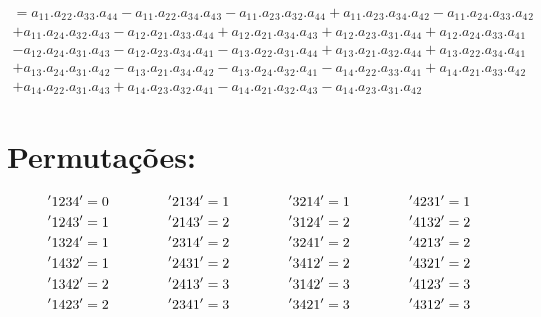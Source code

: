 \documentclass{article}
\begin{document}
\begin{equation*}
    \begin{split}
    = a_1{}_1.a_2{}_2.a_3{}_3.a_4{}_4 - a_1{}_1.a_2{}_2.a_3{}_4.a_4{}_3 - a_1{}_1.a_2{}_3.a_3{}_2.a_4{}_4 + a_1{}_1.a_2{}_3.a_3{}_4.a_4{}_2 - a_1{}_1.a_2{}_4.a_3{}_3.a_4{}_2\\
    + a_1{}_1.a_2{}_4.a_3{}_2.a_4{}_3 - a_1{}_2.a_2{}_1.a_3{}_3.a_4{}_4 + a_1{}_2.a_2{}_1.a_3{}_4.a_4{}_3 + a_1{}_2.a_2{}_3.a_3{}_1.a_4{}_4 + a_1{}_2.a_2{}_4.a_3{}_3.a_4{}_1\\
    - a_1{}_2.a_2{}_4.a_3{}_1.a_4{}_3 - a_1{}_2.a_2{}_3.a_3{}_4.a_4{}_1 - a_1{}_3.a_2{}_2.a_3{}_1.a_4{}_4 + a_1{}_3.a_2{}_1.a_3{}_2.a_4{}_4 + a_1{}_3.a_2{}_2.a_3{}_4.a_4{}_1\\
    + a_1{}_3.a_2{}_4.a_3{}_1.a_4{}_2 - a_1{}_3.a_2{}_1.a_3{}_4.a_4{}_2 - a_1{}_3.a_2{}_4.a_3{}_2.a_4{}_1 - a_1{}_4.a_2{}_2.a_3{}_3.a_4{}_1 + a_1{}_4.a_2{}_1.a_3{}_3.a_4{}_2\\
    + a_1{}_4.a_2{}_2.a_3{}_1.a_4{}_3 + a_1{}_4.a_2{}_3.a_3{}_2.a_4{}_1 - a_1{}_4.a_2{}_1.a_3{}_2.a_4{}_3 - a_1{}_4.a_2{}_3.a_3{}_1.a_4{}_2 
    \end{split}
\end{equation*}

\section{Permutações:}

\[ '1234' = 0 \hspace{1.5cm} '2134' = 1 \hspace{1.5cm} '3214' = 1 \hspace{1.5cm} '4231' = 1\] 
\[ '1243' = 1 \hspace{1.5cm} '2143' = 2 \hspace{1.5cm} '3124' = 2 \hspace{1.5cm} '4132' = 2\] 
\[ '1324' = 1 \hspace{1.5cm} '2314' = 2 \hspace{1.5cm} '3241' = 2 \hspace{1.5cm} '4213' = 2\] 
\[ '1432' = 1 \hspace{1.5cm} '2431' = 2 \hspace{1.5cm} '3412' = 2 \hspace{1.5cm} '4321' = 2\]
\[ '1342' = 2 \hspace{1.5cm} '2413' = 3 \hspace{1.5cm} '3142' = 3 \hspace{1.5cm} '4123' = 3\] 
\[ '1423' = 2 \hspace{1.5cm} '2341' = 3 \hspace{1.5cm} '3421' = 3 \hspace{1.5cm} '4312' = 3\]\newline 
\end{document}
